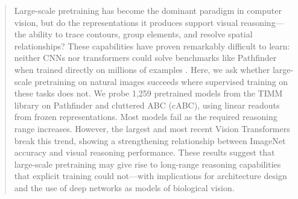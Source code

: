 \documentclass[10pt,letterpaper]{article}
\begin{document}
\begin{abstract}
Large-scale pretraining has become the dominant paradigm in computer vision, but do the representations it produces support visual reasoning---the ability to trace contours, group elements, and resolve spatial relationships? These capabilities have proven remarkably difficult to learn: neither CNNs nor transformers could solve benchmarks like Pathfinder when trained directly on millions of examples \citep{Serre2018a,Serre2018b,LRA}. Here, we ask whether large-scale pretraining on natural images succeeds where supervised training on these tasks does not. We probe 1,259 pretrained models from the TIMM library on Pathfinder and cluttered ABC (cABC), using linear readouts from frozen representations. Most models fail as the required reasoning range increases. However, the largest and most recent Vision Transformers break this trend, showing a strengthening relationship between ImageNet accuracy and visual reasoning performance. These results suggest that large-scale pretraining may give rise to long-range reasoning capabilities that explicit training could not---with implications for architecture design and the use of deep networks as models of biological vision.
\end{abstract}
\end{document}
